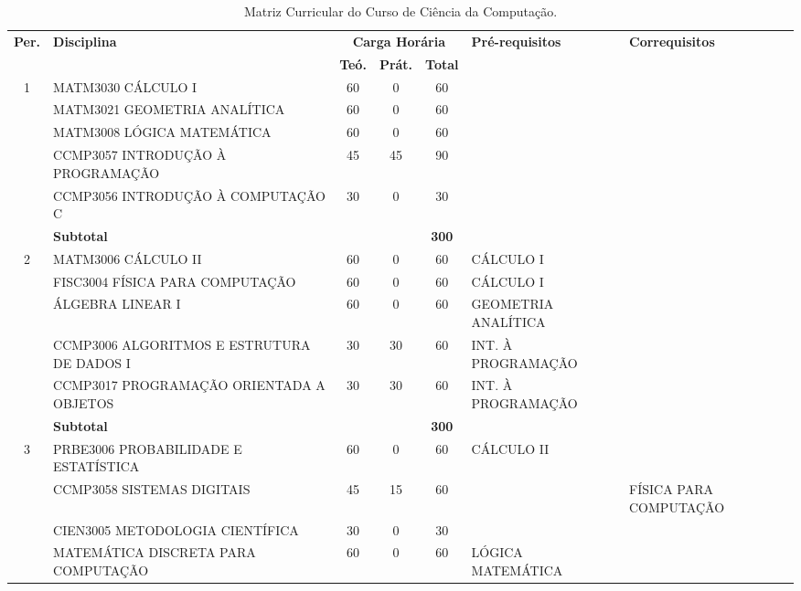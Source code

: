 \documentclass[
	12pt,				%
	openright,			%
  oneside,     %
	a4paper,			%
	chapter=TITLE,		%
	english,			%
	french,				%
	spanish,			%
	brazil				%
	]{abntex2}
\begin{document}
\begin{center}
    \begin{tiny}
      \begin{longtable}{cp{4.5cm}cccp{2.8cm}p{2.8cm}}
        \caption{\label{quadro:matriz-curricular-do-curso}Matriz Curricular do Curso de  Ciência da Computação.}\\
      \toprule
      \textbf{Per.} & \textbf{Disciplina} & \multicolumn{3}{c}{\textbf{Carga Horária}} & \textbf{Pré-requisitos} & \textbf{Correquisitos}\\
      & & \textbf{Teó.} & \textbf{Prát.} & \textbf{Total} & & \\
      \midrule
      1 
        & MATM3030 CÁLCULO I & 60 & 0 & 60 & & \\ \cline{2-7}
        & MATM3021 GEOMETRIA ANALÍTICA & 60 & 0 & 60 & & \\ \cline{2-7}
        & MATM3008 LÓGICA MATEMÁTICA & 60 & 0 & 60  & &\\ \cline{2-7}
        & CCMP3057 INTRODUÇÃO À PROGRAMAÇÃO & 45 & 45 & 90  & &\\ \cline{2-7}
        & CCMP3056 INTRODUÇÃO À COMPUTAÇÃO C & 30 & 0 & 30  & &\\ \midrule
        & \multicolumn{3}{l}{\textbf{Subtotal}} & \textbf{300} & & \\ \midrule
      2 
        & MATM3006 CÁLCULO II & 60 & 0 & 60 & CÁLCULO I & \\ \cline{2-7}   
        & FISC3004 FÍSICA PARA COMPUTAÇÃO & 60 & 0 & 60 & CÁLCULO I & \\ \cline{2-7}
        & ÁLGEBRA LINEAR I & 60 & 0 & 60 & GEOMETRIA ANALÍTICA & \\ \cline{2-7}
        & CCMP3006 ALGORITMOS E ESTRUTURA DE DADOS I & 30 & 30 & 60 & INT. À PROGRAMAÇÃO & \\  \cline{2-7}
        & CCMP3017 PROGRAMAÇÃO ORIENTADA A OBJETOS & 30 & 30 & 60 & INT. À PROGRAMAÇÃO & \\ \midrule
        & \multicolumn{3}{l}{\textbf{Subtotal}} & \textbf{300} & & \\ \midrule
    3 
        & PRBE3006 PROBABILIDADE E ESTATÍSTICA & 60 & 0 & 60 & CÁLCULO II & \\ \cline{2-7}
        & CCMP3058 SISTEMAS DIGITAIS & 45 & 15 & 60 & & FÍSICA PARA COMPUTAÇÃO \\ \cline{2-7}
        & CIEN3005 METODOLOGIA CIENTÍFICA & 30 & 0 & 30 & & \\ \cline{2-7}
        & MATEMÁTICA DISCRETA PARA COMPUTAÇÃO & 60 & 0 & 60 & LÓGICA MATEMÁTICA & \\ \cline{2-7}

\end{longtable}
\end{tiny}
\end{center}
\end{document}
